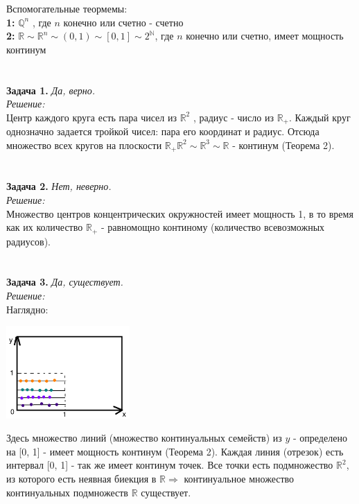 \documentclass[12pt,a4paper]{scrartcl}
\title{}
\date{Егерев Артем, БПМИ-167}
\author{Домашняя работа по дискретной математике 15}
\begin{document}
\maketitle
\noindent Вспомогательные теормемы:\\
\textbf{1:} $\mathbb{Q}^n$ , где $n$ конечно  или счетно - счетно\\ 
\textbf{2:} $\mathbb{R} \sim \mathbb{R}^n \sim (0, 1) \sim [0, 1] \sim 2^{\mathbb{N}}$, где $n$ конечно или счетно, имеет мощность континум
\\ \\ \\

\noindent \textbf{Задача 1.} 
\textit{Да, верно.}  \\
\textit{Решение:} \\ 
Центр каждого круга есть пара чисел из $\mathbb{R}^2$ , радиус - число из $\mathbb{R}_+$. Каждый круг однозначно задается тройкой чисел: пара его координат  и радиус. Отсюда множество всех кругов на плоскости $\mathbb{R}_+ \mathbb{R}^2 \sim \mathbb{R}^3 \sim \mathbb{R}$ -  континум (Теорема 2).  
\\ \\ \\

\noindent \textbf{Задача 2.} \textit{Нет, неверно.} \\
\textit{Решение:} \\
Множество центров концентрических окружностей имеет мощность 1, в то время как их количество $\mathbb{R}_+$ - равномощно континому (количество всевозможных радиусов).
\\ \\ \\


\noindent \textbf{Задача 3.} \textit{Да, существует.}\\
\textit{Решение:} \\ 
Наглядно: \\
\begin{center}
	\includegraphics[height = 100pt]{3.png}	
\end{center}
Здесь множество линий (множество континуальных семейств) из $y$  - определено на [0, 1] - имеет мощность континум (Теорема 2). Каждая линия (отрезок)   есть интервал [0, 1] - так же   имеет континум точек. Все точки есть подмножество $\mathbb{R}^2$, из которого есть неявная биекция в $\mathbb{R} \Rightarrow$ континуальное множество континуальных подмножеств $\mathbb{R}$ существует.
\\ \\ \\
\end{document}
